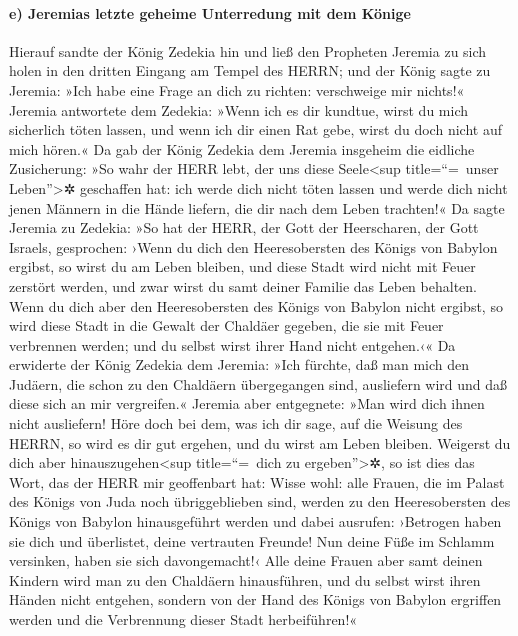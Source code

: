 \hypertarget{e-jeremias-letzte-geheime-unterredung-mit-dem-kuxf6nige}{%
\paragraph{e) Jeremias letzte geheime Unterredung mit dem
Könige}\label{e-jeremias-letzte-geheime-unterredung-mit-dem-kuxf6nige}}

Hierauf sandte der König Zedekia hin und ließ den
Propheten Jeremia zu sich holen in den dritten Eingang am Tempel des
HERRN; und der König sagte zu Jeremia: »Ich habe eine Frage an dich zu
richten: verschweige mir nichts!« Jeremia antwortete dem
Zedekia: »Wenn ich es dir kundtue, wirst du mich sicherlich töten
lassen, und wenn ich dir einen Rat gebe, wirst du doch nicht auf mich
hören.« Da gab der König Zedekia dem Jeremia insgeheim
die eidliche Zusicherung: »So wahr der HERR lebt, der uns diese
Seele\textless sup title=``=~unser Leben''\textgreater✲ geschaffen hat:
ich werde dich nicht töten lassen und werde dich nicht jenen Männern in
die Hände liefern, die dir nach dem Leben trachten!« Da
sagte Jeremia zu Zedekia: »So hat der HERR, der Gott der Heerscharen,
der Gott Israels, gesprochen: ›Wenn du dich den Heeresobersten des
Königs von Babylon ergibst, so wirst du am Leben bleiben, und diese
Stadt wird nicht mit Feuer zerstört werden, und zwar wirst du samt
deiner Familie das Leben behalten. Wenn du dich aber den
Heeresobersten des Königs von Babylon nicht ergibst, so wird diese Stadt
in die Gewalt der Chaldäer gegeben, die sie mit Feuer verbrennen werden;
und du selbst wirst ihrer Hand nicht entgehen.‹« Da
erwiderte der König Zedekia dem Jeremia: »Ich fürchte, daß man mich den
Judäern, die schon zu den Chaldäern übergegangen sind, ausliefern wird
und daß diese sich an mir vergreifen.« Jeremia aber
entgegnete: »Man wird dich ihnen nicht ausliefern! Höre doch bei dem,
was ich dir sage, auf die Weisung des HERRN, so wird es dir gut ergehen,
und du wirst am Leben bleiben. Weigerst du dich aber
hinauszugehen\textless sup title=``=~dich zu ergeben''\textgreater✲, so
ist dies das Wort, das der HERR mir geoffenbart hat:
Wisse wohl: alle Frauen, die im Palast des Königs von
Juda noch übriggeblieben sind, werden zu den Heeresobersten des Königs
von Babylon hinausgeführt werden und dabei ausrufen: ›Betrogen haben sie
dich und überlistet, deine vertrauten Freunde! Nun deine Füße im Schlamm
versinken, haben sie sich davongemacht!‹ Alle deine
Frauen aber samt deinen Kindern wird man zu den Chaldäern hinausführen,
und du selbst wirst ihren Händen nicht entgehen, sondern von der Hand
des Königs von Babylon ergriffen werden und die Verbrennung dieser Stadt
herbeiführen!«

